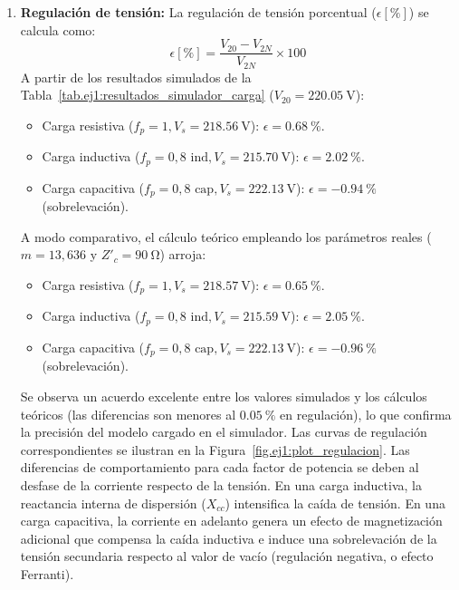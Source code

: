 \begin{enumerate}
    \item \textbf{Regulación de tensión:}
    La regulación de tensión porcentual ($\epsilon [\%]$) se calcula como:
    \begin{equation}
        \epsilon [\%] = \frac{V_{20} - V_{2N}}{V_{2N}} \times 100
    \end{equation}
    A partir de los resultados simulados de la Tabla~\ref{tab.ej1:resultados_simulador_carga} ($V_{20} = \SI{220,05}{\volt}$):
    \begin{itemize}
        \item Carga resistiva ($f_p = 1, V_s = \SI{218,56}{\volt}$): $\epsilon = \SI{0,68}{\percent}$.
        \item Carga inductiva ($f_p = 0,8\text{ ind}, V_s = \SI{215,70}{\volt}$): $\epsilon = \SI{2,02}{\percent}$.
        \item Carga capacitiva ($f_p = 0,8\text{ cap}, V_s = \SI{222,13}{\volt}$): $\epsilon = \SI{-0,94}{\percent}$ (sobrelevación).
    \end{itemize}
    
    A modo comparativo, el cálculo teórico empleando los parámetros reales ($m = 13,636$ y $Z'_c = \SI{90}{\ohm}$) arroja:
    \begin{itemize}
        \item Carga resistiva ($f_p = 1, V_s = \SI{218,57}{\volt}$): $\epsilon = \SI{0,65}{\percent}$.
        \item Carga inductiva ($f_p = 0,8\text{ ind}, V_s = \SI{215,59}{\volt}$): $\epsilon = \SI{2,05}{\percent}$.
        \item Carga capacitiva ($f_p = 0,8\text{ cap}, V_s = \SI{222,13}{\volt}$): $\epsilon = \SI{-0,96}{\percent}$ (sobrelevación).
    \end{itemize}

    Se observa un acuerdo excelente entre los valores simulados y los cálculos teóricos (las diferencias son menores al
    $\SI{0,05}{\percent}$ en regulación), lo que confirma la precisión del modelo cargado en el simulador.
    Las curvas de regulación correspondientes se ilustran en la Figura~\ref{fig.ej1:plot_regulacion}. Las diferencias de comportamiento para cada factor de potencia se deben al desfase de la corriente respecto de la tensión. En una
    carga inductiva, la reactancia interna de dispersión ($X_{cc}$) intensifica la caída de tensión. En una carga capacitiva,
    la corriente en adelanto genera un efecto de magnetización adicional que compensa la caída inductiva e induce una
    sobrelevación de la tensión secundaria respecto al valor de vacío (regulación negativa, o efecto Ferranti).


\end{enumerate}
